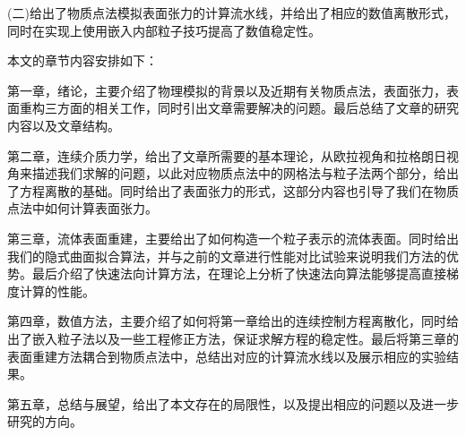 (二)给出了物质点法模拟表面张力的计算流水线，并给出了相应的数值离散形式，同时在实现上使用嵌入内部粒子技巧提高了数值稳定性。

本文的章节内容安排如下：

    第一章，绪论，主要介绍了物理模拟的背景以及近期有关物质点法，表面张力，表面重构三方面的相关工作，同时引出文章需要解决的问题。最后总结了文章的研究内容以及文章结构。

    第二章，连续介质力学，给出了文章所需要的基本理论，从欧拉视角和拉格朗日视角来描述我们求解的问题，以此对应物质点法中的网格法与粒子法两个部分，给出了方程离散的基础。同时给出了表面张力的形式，这部分内容也引导了我们在物质点法中如何计算表面张力。

    第三章，流体表面重建，主要给出了如何构造一个粒子表示的流体表面。同时给出我们的隐式曲面拟合算法，并与之前的文章进行性能对比试验来说明我们方法的优势。最后介绍了快速法向计算方法，在理论上分析了快速法向算法能够提高直接梯度计算的性能。

    第四章，数值方法，主要介绍了如何将第一章给出的连续控制方程离散化，同时给出了嵌入粒子法以及一些工程修正方法，保证求解方程的稳定性。最后将第三章的表面重建方法耦合到物质点法中，总结出对应的计算流水线以及展示相应的实验结果。

    第五章，总结与展望，给出了本文存在的局限性，以及提出相应的问题以及进一步研究的方向。

